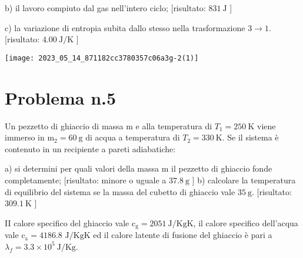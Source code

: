 \documentclass[10pt]{article}
\begin{document}
b) il lavoro compiuto dal gas nell'intero ciclo; [risultato: \(831 \mathrm{~J}\) ]

c) la variazione di entropia subita dallo stesso nella trasformazione \(3 \rightarrow 1\). [risultato: \(4.00 \mathrm{~J} / \mathrm{K}\) ]

\begin{center}
\texttt{[image: 2023\_05\_14\_871182cc3780357c06a3g-2(1)]}
\end{center}

\section{Problema n.5}
Un pezzetto di ghiaccio di massa \(\mathrm{m}\) e alla temperatura di \(T_{1}=250 \mathrm{~K}\) viene immerso in \(\mathrm{m}_{2}=60 \mathrm{~g}\) di acqua a temperatura di \(T_{2}=330 \mathrm{~K}\). Se il sistema è contenuto in un recipiente a pareti adiabatiche:

a) si determini per quali valori della massa m il pezzetto di ghiaccio fonde completamente; [risultato: minore o uguale a \(37.8 \mathrm{~g}\) ] b) calcolare la temperatura di equilibrio del sistema se la massa del cubetto di ghiaccio vale \(35 \mathrm{~g}\). [risultato: \(309.1 \mathrm{~K}\) ]

II calore specifico del ghiaccio vale \(\mathrm{c}_{\mathrm{g}}=2051 \mathrm{~J} / \mathrm{KgK}\), il calore specifico dell'acqua vale \(\mathrm{c}_{\mathrm{a}}=4186.8\) \(\mathrm{J} / \mathrm{KgK}\) ed il calore latente di fusione del ghiaccio è pari a \(\lambda_{f}=3.3 \times 10^{5} \mathrm{~J} / \mathrm{Kg}\).
\end{document}
